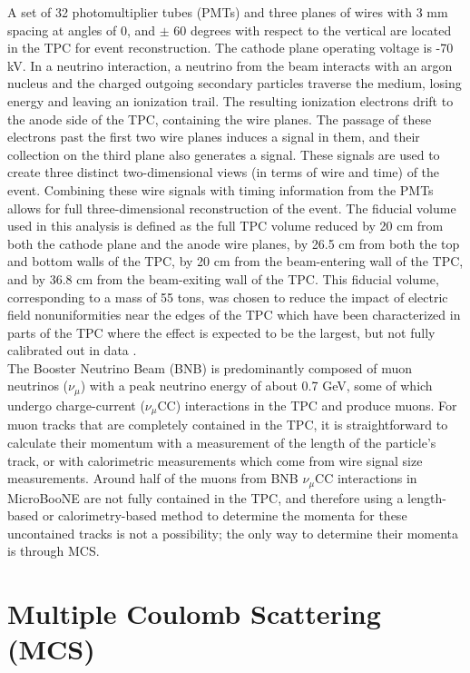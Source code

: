 \documentclass[a4paper,11pt]{article}
\begin{document}
A set of 32 photomultiplier tubes (PMTs) and three planes of wires with 3 mm spacing at angles of 0, and $\pm$ 60 degrees with respect to the vertical are located in the TPC for event reconstruction. The cathode plane operating voltage is -70 kV. In a neutrino interaction, a neutrino from the beam interacts with an argon nucleus and the charged outgoing secondary particles traverse the medium, losing energy and leaving an ionization trail. The resulting ionization electrons drift to the anode side of the TPC, containing the wire planes. The passage of these electrons past the first two wire planes induces a signal in them, and their collection on the third plane also generates a signal. These signals are used to create three distinct two-dimensional views (in terms of wire and time) of the event. Combining these wire signals with timing information from the PMTs allows for full three-dimensional reconstruction of the event. The fiducial volume used in this analysis is defined as the full TPC volume reduced by 20 cm from both the cathode plane and the anode wire planes, by 26.5 cm from both the top and bottom walls of the TPC, by 20 cm from the beam-entering wall of the TPC, and by 36.8 cm from the beam-exiting wall of the TPC. This fiducial volume, corresponding to a mass of 55 tons, was chosen to reduce the impact of electric field nonuniformities near the edges of the TPC which have been characterized in parts of the TPC where the effect is expected to be the largest, but not fully calibrated out in data \cite{SCE_publicnote}.\\

The Booster Neutrino Beam (BNB) is predominantly composed of muon neutrinos ($\nu_\mu$) with a peak neutrino energy of about 0.7 GeV, some of which undergo charge-current ($\nu_\mu$CC) interactions in the TPC and produce muons. For muon tracks that are completely contained in the TPC, it is straightforward to calculate their momentum with a measurement of the length of the particle's track, or with calorimetric measurements which come from wire signal size measurements. Around half of the muons from BNB $\nu_\mu$CC interactions in MicroBooNE are not fully contained in the TPC, and therefore using a length-based or calorimetry-based method to determine the momenta for these uncontained tracks is not a possibility; the only way to determine their momenta is through MCS. \\

\section{Multiple Coulomb Scattering (MCS)}
\end{document}
